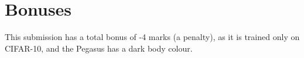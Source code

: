 \documentclass{article}
\begin{document}
\section*{Bonuses}
This submission has a total bonus of -4 marks (a penalty), as it is trained only on CIFAR-10, and the Pegasus has a dark body colour.

\printbibliography
\end{document}
